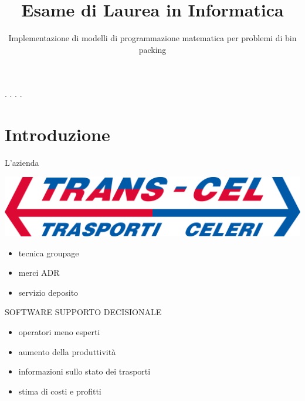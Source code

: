 \documentclass{beamer}
\title{\small{Esame di Laurea in Informatica}}
\subtitle{\Large{Implementazione di modelli di programmazione matematica per problemi di bin packing}}
\author[Daniel Rossi]{%
	\usebox{\authbox}
}
\institute{\footnotesize{Dipartimento di Matematica ''Tullio Levi Civita''}}
\date{%
	\usebox{\datebox}
}
\begin{document}
\maketitle
.
.
.
.

\section{Introduzione}

\begin{frame}{L'azienda}
	\begin{minipage}[c]{0.45\textwidth}
		\includegraphics[width=1\linewidth]{figures/logo-transcel}
	\end{minipage}
	\hfill
	\begin{minipage}[c]{0.45\textwidth}
		\begin{itemize}
			\item tecnica groupage
			\item merci ADR
			\item servizio deposito
		\end{itemize}
	\end{minipage}
			
	\vspace{3.0em}
	\large{\uppercase{Software supporto decisionale}}
	\begin{itemize}
		\item operatori meno esperti
		\item aumento della produttivit\`a
		\item informazioni sullo stato dei trasporti
		\item stima di costi e profitti
	\end{itemize}
\end{frame}
\end{document}
